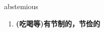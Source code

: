 
\begin{frame}
{\huge abstemious}
\begin{center}
\begin{enumerate}\Large
  \item \textbf{(吃喝等)有节制的，节俭的}
\end{enumerate}
\end{center}
\end{frame}
